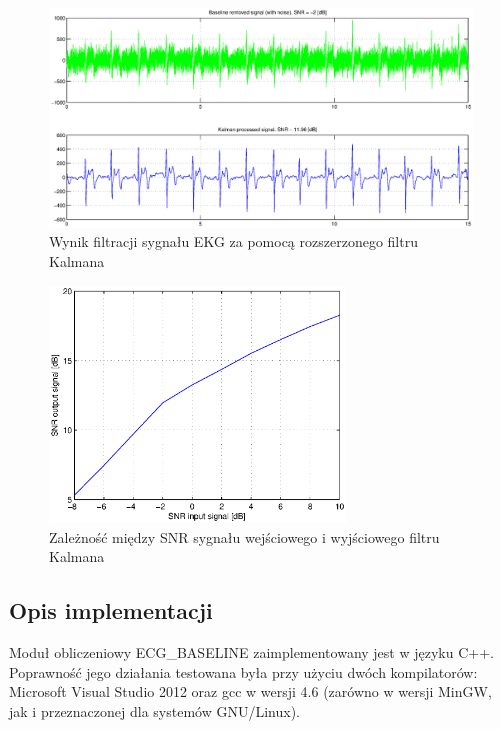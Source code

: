 \begin{figure}[H]
\centering
	\includegraphics[width=\textwidth]{ECG_BASELINE/figures/hardCoreNoise.eps}
\caption{Wynik filtracji sygnału EKG za pomocą rozszerzonego filtru Kalmana}
\label{fig:KalmanOutput}
\end{figure}

\begin{figure}[H]
\centering
	\includegraphics[width=0.7\textwidth]{ECG_BASELINE/figures/snrInOut.eps}
\caption{Zależność między SNR sygnału wejściowego i wyjściowego filtru Kalmana}
\label{fig:KalmanSNR}
\end{figure}



\subsection{Opis implementacji}
Moduł obliczeniowy ECG\_BASELINE zaimplementowany jest w języku C++. Poprawność jego działania testowana była przy użyciu dwóch kompilatorów: Microsoft Visual Studio 2012 oraz gcc w wersji 4.6 (zarówno w wersji MinGW, jak i przeznaczonej dla systemów GNU/Linux).

